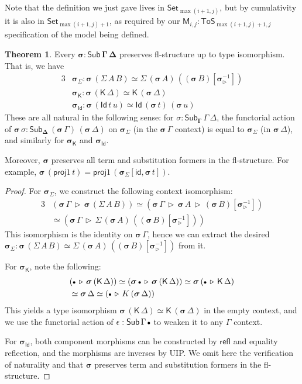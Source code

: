 \documentclass{article}
\theoremstyle{definition}
\theoremstyle{theorem}
\newtheorem{theorem}{Theorem}
\newcommand{\refl}{\mathsf{refl}}
\newcommand{\id}{\mathsf{id}}
\newcommand{\Sub}{\mathsf{Sub}}
\newcommand{\Id}{\mathsf{Id}}
\newcommand{\proj}{\mathsf{proj}}
\newcommand{\Set}{\mathsf{Set}}
\newcommand{\ToS}{\mathsf{ToS}}
\newcommand{\ext}{\triangleright}
\newcommand{\emptycon}{\scaleobj{.75}\bullet}
\newcommand{\K}{\mathsf{K}}
\newcommand{\bGamma}{\boldsymbol{\Gamma}}
\newcommand{\bDelta}{\boldsymbol{\Delta}}
\newcommand{\bsigma}{\boldsymbol{\sigma}}
\newcommand{\bM}{\boldsymbol{\mathsf{M}}}
\begin{document}
Note that the definition we just gave lives in $\Set_{\max(i+1,j)}$, but by
cumulativity it is also in $\Set_{\max(i+1,j)+1}$, as required by our $\bM_{i,j}
: \ToS_{\max(i+1,j)+1, j}$ specification of the model being defined.

\begin{theorem}\label{thm:flpres}
Every $\boldsymbol{\sigma : \Sub\,\Gamma\,\Delta}$ preserves fl-structure up to
type isomorphism. That is, we have
\begin{alignat*}{3}
  & \bsigma_{\Sigma} : \bsigma\,(\Sigma\,A\,B) \simeq \Sigma\,(\bsigma\,A)\,((\bsigma\,B)[\bsigma_{\ext}^{-1}]) \\
  & \bsigma_{\K} : \bsigma\,(\K\,\Delta) \simeq \K\,(\bsigma\,\Delta) \\
  & \bsigma_{\Id} : \bsigma\,(\Id\,t\,u) \simeq \Id\,(\bsigma\,t)\,(\bsigma\,u)
\end{alignat*}
These are all natural in the following sense: for $\sigma :
\Sub_{\bGamma}\,\Gamma\,\Delta$, the functorial action of $\bsigma\,\sigma :
\Sub_{\bDelta}\,(\bsigma\,\Gamma)\,(\bsigma\,\Delta)$ on $\bsigma_{\Sigma}$ (in
the $\bsigma\,\Gamma$ context) is equal to $\bsigma_{\Sigma}$ (in
$\bsigma\,\Delta$), and similarly for $\bsigma_{\K}$ and $\bsigma_{\Id}$.

Moreover, $\bsigma$ preserves all term and substitution formers in the
fl-structure. For example, $\bsigma\,(\proj1\,t) = \proj1\,
(\bsigma_{\Sigma}[\id, \bsigma\,t])$.
\end{theorem}
\begin{proof}
For $\bsigma_{\Sigma}$, we construct the following context isomorphism:
\begin{alignat*}{3}
& (\bsigma\,\Gamma\,\ext\,\bsigma\,(\Sigma\,A\,B)) \simeq
  (\bsigma\,\Gamma\,\ext\,\bsigma\,A\,\ext\,(\bsigma\,B)[\bsigma_{\ext}^{-1}]) \\
& \simeq (\bsigma\,\Gamma\,\ext\,\Sigma\,(\bsigma\,A)\,((\bsigma\,B)[\bsigma_{\ext}^{-1}]))
\end{alignat*}
This isomorphism is the identity on $\bsigma\,\Gamma$, hence we can extract the
desired $\bsigma_{\Sigma} : \bsigma\,(\Sigma\,A\,B) \simeq
\Sigma\,(\bsigma\,A)\,((\bsigma\,B)[\bsigma_{\ext}^{-1}])$ from it.

For $\bsigma_{\K}$, note the following:
\begin{alignat*}{3}
  & (\emptycon\,\ext\,\bsigma\,(\K\,\Delta)) \simeq
    (\bsigma\,\emptycon\,\ext\,\bsigma\,(\K\,\Delta)) \simeq
    \bsigma\,(\emptycon\,\ext\,\K\,\Delta)\\
  & \simeq \bsigma\,\Delta \simeq (\emptycon\,\ext\,K\,(\bsigma\,\Delta))
\end{alignat*}
This yields a type isomorphism $\bsigma\,(\K\,\Delta) \simeq
\K\,(\bsigma\,\Delta)$ in the empty context, and we use the functorial action of
$\epsilon : \Sub\,\Gamma\,\emptycon$ to weaken it to any $\Gamma$ context.

For $\bsigma_{\Id}$, both component morphisms can be constructed by $\refl$ and
equality reflection, and the morphisms are inverses by UIP. We omit here the
verification of naturality and that $\bsigma$ preserves term and substitution
formers in the fl-structure.
\end{proof}
\end{document}
